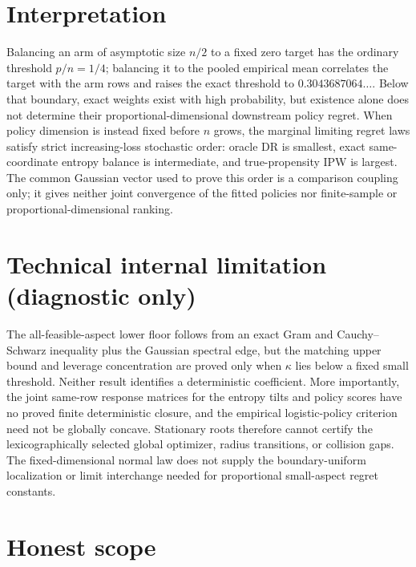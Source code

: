 \documentclass{article}
\begin{document}
\section{Interpretation}

Balancing an arm of asymptotic size \(n/2\) to a fixed zero target has the ordinary threshold \(p/n=1/4\); balancing it to the pooled empirical mean correlates the target with the arm rows and raises the exact threshold to \(0.3043687064\ldots\). Below that boundary, exact weights exist with high probability, but existence alone does not determine their proportional-dimensional downstream policy regret. When policy dimension is instead fixed before \(n\) grows, the marginal limiting regret laws satisfy strict increasing-loss stochastic order: oracle DR is smallest, exact same-coordinate entropy balance is intermediate, and true-propensity IPW is largest. The common Gaussian vector used to prove this order is a comparison coupling only; it gives neither joint convergence of the fitted policies nor finite-sample or proportional-dimensional ranking.

\section*{Technical internal limitation (diagnostic only)}

The all-feasible-aspect lower floor follows from an exact Gram and Cauchy--Schwarz inequality plus the Gaussian spectral edge, but the matching upper bound and leverage concentration are proved only when \(\kappa\) lies below a fixed small threshold. Neither result identifies a deterministic coefficient. More importantly, the joint same-row response matrices for the entropy tilts and policy scores have no proved finite deterministic closure, and the empirical logistic-policy criterion need not be globally concave. Stationary roots therefore cannot certify the lexicographically selected global optimizer, radius transitions, or collision gaps. The fixed-dimensional normal law does not supply the boundary-uniform localization or limit interchange needed for proportional small-aspect regret constants.

\section{Honest scope}
\end{document}
